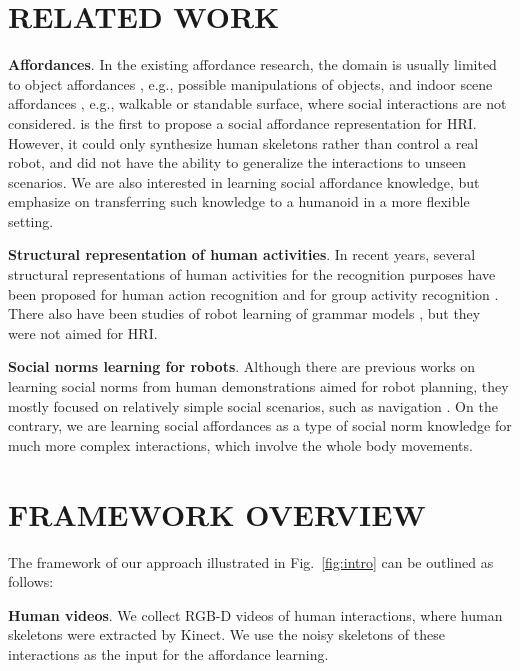 \documentclass[letterpaper, 10 pt, conference]{ieeeconf}  %
\begin{document}
\section{RELATED WORK}


\textbf{Affordances}. In the existing affordance research, the domain is usually limited to object affordances \cite{Montesano2008,Kjellstrom2011,Bogdan2012,Zhu2014,Koppula2014,Pieropan2014,Sheng2015,Zhu2015}, e.g., possible manipulations of objects, and indoor scene affordances \cite{Gupta2011,Jiang2013}, e.g., walkable or standable surface, where social interactions are not considered. \cite{Shuijcai2016} is the first to propose a social affordance representation for HRI. However, it could only synthesize human skeletons rather than control a real robot, and did not have the ability to generalize the interactions to unseen scenarios. We are also interested in learning social affordance knowledge, but emphasize on transferring such knowledge to a humanoid in a more flexible setting.

\textbf{Structural representation of human activities}. In recent years, several structural representations of human activities for the recognition purposes have been proposed for human action recognition \cite{Gupta2009,Brendel2011,Pei2013,Lan2015} and for group activity recognition \cite{RyooIJCV2011,LanPAMI2012,Amer2012,Choi2014,Lan2014,Shu2015,Deng2016}. There also have been studies of robot learning of grammar models \cite{Lee2013, Yang2015, Xiong2016}, but they were not aimed for HRI.

\textbf{Social norms learning for robots}. Although there are previous works on learning social norms from human demonstrations aimed for robot planning, they mostly focused on relatively simple social scenarios, such as navigation \cite{Luber2012, okal2016}. On the contrary, we are learning social affordances as a type of social norm knowledge for much more complex interactions, which involve the whole body movements.







\section{FRAMEWORK OVERVIEW}

The framework of our approach illustrated in Fig.~\ref{fig:intro} can be outlined as follows:

\textbf{Human videos}. We collect RGB-D videos of human interactions, where human skeletons were extracted by Kinect. We use the noisy skeletons of these interactions as the input for the affordance learning.
\end{document}
